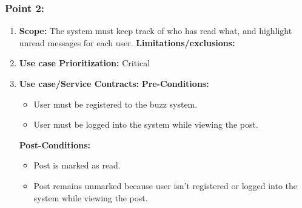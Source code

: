 \documentclass[11pt]{article}
\begin{document}
\subsubsection{Point 2:} 
\begin{enumerate}
\item 
\textbf{Scope:}
The system must keep track of who has read what, and highlight unread messages for each user.
\newline
\textbf{Limitations/exclusions:} 

\item 
\textbf{Use case Prioritization:} Critical

\item 
\textbf{Use case/Service Contracts:} 
\newline
\textbf{Pre-Conditions: }
\begin{itemize}
\item User must be registered to the buzz system.
\item User must be logged into the system while viewing the post.
\end{itemize}
 

\textbf{Post-Conditions: }
\begin{itemize}
\item Post is marked as read.
\item Post remains unmarked because user isn't registered or logged into the system while viewing the post.
\end{itemize}
\end{enumerate}
\end{document}
